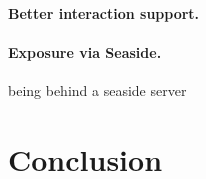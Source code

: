 \documentclass[preprint,10pt]{sigplanconf}
\newcommand{\seclabel}[1]{\label{sec:#1}}
\begin{document}
\paragraph{Better interaction support.}

\paragraph{Exposure via Seaside.}
being behind a seaside server



\section{Conclusion}\seclabel{conclusion}



%



\end{document}
